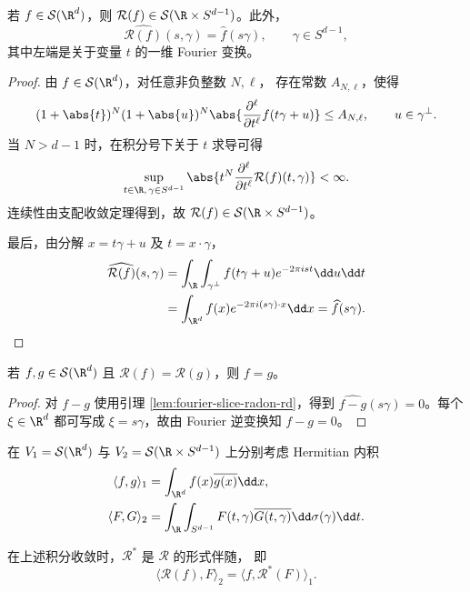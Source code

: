 \begin{lemma}
	\label{lem:fourier-slice-radon-rd}
	若 $f\in\mathcal S(\R^d)$，则
	$\mathcal R(f)\in\mathcal S(\R\times S^{d-1})$。此外，
	\[
	\widehat{\mathcal R(f)}(s,\gamma)
	=\widehat f(s\gamma),
	\qquad \gamma\in S^{d-1},
	\]
	其中左端是关于变量 $t$ 的一维 Fourier 变换。
\end{lemma}

\begin{proof}
	由 $f\in\mathcal S(\R^d)$，对任意非负整数 $N,\ell$，
	存在常数 $A_{N,\ell}$，使得
	\[
	(1+\abs{t})^N(1+\abs{u})^N
	\abs{ \frac{\partial^\ell}{\partial t^\ell}f(t\gamma+u)}
	\leq A_{N,\ell},
	\qquad u\in\gamma^\perp.
	\]
	当 $N>d-1$ 时，在积分号下关于 $t$ 求导可得
	\[
	\sup_{t\in\R,\,\gamma\in S^{d-1}}
	\abs{t^N\frac{\partial^\ell}{\partial t^\ell}
	\mathcal R(f)(t,\gamma)}<\infty.
	\]
	连续性由支配收敛定理得到，故
	$\mathcal R(f)\in\mathcal S(\R\times S^{d-1})$。

	最后，由分解 $x=t\gamma+u$ 及 $t=x\cdot\gamma$，
	\[
	\begin{aligned}
	\widehat{\mathcal R(f)}(s,\gamma)
	&=\int_{\R}\int_{\gamma^\perp}
	f(t\gamma+u)e^{-2\pi ist}\dd u\dd t\\
	&=\int_{\R^d}f(x)e^{-2\pi i(s\gamma)\cdot x}\dd x
	=\widehat f(s\gamma).
	\end{aligned}
	\]
\end{proof}

\begin{corollary}\label{cor:radon-injective-rd}
	若 $f,g\in\mathcal S(\R^d)$ 且
	$\mathcal R(f)=\mathcal R(g)$，则 $f=g$。
\end{corollary}

\begin{proof}
	对 $f-g$ 使用引理 \ref{lem:fourier-slice-radon-rd}，得到
	$\widehat{f-g}(s\gamma)=0$。每个 $\xi\in\R^d$ 都可写成
	$\xi=s\gamma$，故由 Fourier 逆变换知 $f-g=0$。
\end{proof}

在 $V_1=\mathcal S(\R^d)$ 与
$V_2=\mathcal S(\R\times S^{d-1})$ 上分别考虑 Hermitian 内积
\[
\begin{aligned}
\langle f,g\rangle_1
&=\int_{\R^d}f(x)\overline{g(x)}\dd x,\\
\langle F,G\rangle_2
&=\int_{\R}\int_{S^{d-1}}
F(t,\gamma)\overline{G(t,\gamma)}
\dd\sigma(\gamma)\dd t.
\end{aligned}
\]

\begin{proposition}\label{prop:radon-adjoint-rd}
	在上述积分收敛时，$\mathcal R^*$ 是 $\mathcal R$ 的形式伴随，
	即
	\[
	\langle\mathcal R(f),F\rangle_2
	=\langle f,\mathcal R^*(F)\rangle_1.
	\]
\end{proposition}

